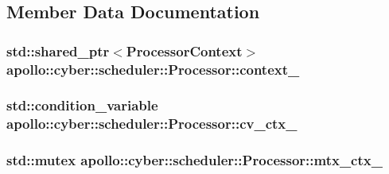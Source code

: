 \subsection{Member Data Documentation}
\hypertarget{classapollo_1_1cyber_1_1scheduler_1_1Processor_aeec2ffd44e4449e5a14f62bc4ce90473}{
\subsubsection[{context\-\_\-}]{\setlength{\rightskip}{0pt plus 5cm}std\-::shared\-\_\-ptr$<${\bf Processor\-Context}$>$ apollo\-::cyber\-::scheduler\-::\-Processor\-::context\-\_\-\hspace{0.3cm}{\ttfamily [private]}}}\label{classapollo_1_1cyber_1_1scheduler_1_1Processor_aeec2ffd44e4449e5a14f62bc4ce90473}
\hypertarget{classapollo_1_1cyber_1_1scheduler_1_1Processor_a7cb6c27d4d7922832e3a357438f129e6}{
\subsubsection[{cv\-\_\-ctx\-\_\-}]{\setlength{\rightskip}{0pt plus 5cm}std\-::condition\-\_\-variable apollo\-::cyber\-::scheduler\-::\-Processor\-::cv\-\_\-ctx\-\_\-\hspace{0.3cm}{\ttfamily [private]}}}\label{classapollo_1_1cyber_1_1scheduler_1_1Processor_a7cb6c27d4d7922832e3a357438f129e6}
\hypertarget{classapollo_1_1cyber_1_1scheduler_1_1Processor_aa2f22c012a66da1ada177e5839a0c8b9}{
\subsubsection[{mtx\-\_\-ctx\-\_\-}]{\setlength{\rightskip}{0pt plus 5cm}std\-::mutex apollo\-::cyber\-::scheduler\-::\-Processor\-::mtx\-\_\-ctx\-\_\-\hspace{0.3cm}{\ttfamily [private]}}}\label{classapollo_1_1cyber_1_1scheduler_1_1Processor_aa2f22c012a66da1ada177e5839a0c8b9}
